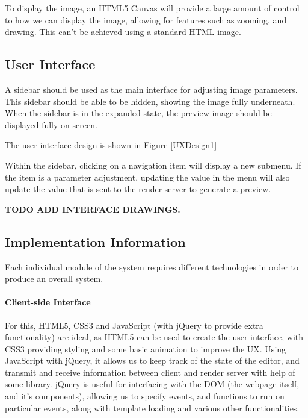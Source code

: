 \documentclass[12pt,a4paper]{article}
\begin{document}
  To display the image, an HTML5 Canvas will provide a large amount of control to
  how we can display the image, allowing for features such as zooming, and drawing. This can't be
  achieved using a standard HTML image.

\subsection{User Interface}\label{UserInterface}
  A sidebar should be used as the main interface for adjusting image parameters.
  This sidebar should be able to be hidden, showing the image fully underneath.
  When the sidebar is in the expanded state, the preview image should be displayed
  fully on screen.

  The user interface design is shown in Figure \ref{UXDesign1}

  Within the sidebar, clicking on a navigation item will display a new submenu.
  If the item is a parameter adjustment, updating the value in the menu will also
  update the value that is sent to the render server to generate a preview.

\textbf{TODO ADD INTERFACE DRAWINGS.}

\subsection{Implementation Information}
Each individual module of the system requires different technologies in order to
produce an overall system.

\paragraph{Client-side Interface}
For this, HTML5, CSS3 and JavaScript (with jQuery to provide extra functionality)
are ideal, as HTML5 can be used to create the user interface, with CSS3 providing styling
and some basic animation to improve the UX. Using JavaScript with jQuery, it allows us
to keep track of the state of the editor, and transmit and receive information between client and
render server with help of some library. jQuery is useful for interfacing with the
DOM (the webpage itself, and it's components), allowing us to specify events, and functions
to run on particular events, along with template loading and various other functionalities.
\end{document}
